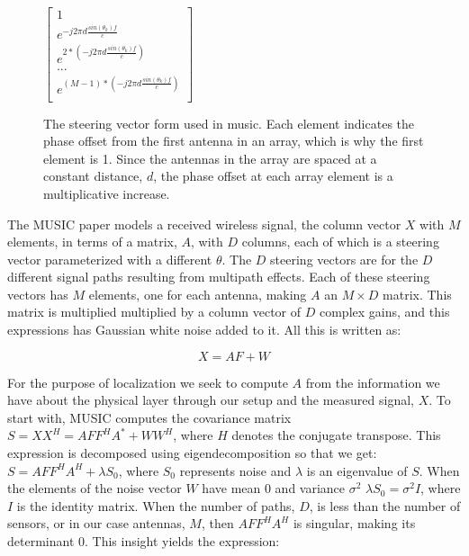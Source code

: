 \documentclass[12pt]{report}
\begin{document}
\begin{figure}
    \begin{center}
        \caption{The steering vector form used in music. Each element indicates the phase offset from the first antenna in an array, which is why the first element is 1. Since the antennas in the array are spaced at a constant distance, $d$, the phase offset at each array element is a multiplicative increase.}
        \label{figure: music-steering-vector}
        $\begin{bmatrix}
        1 \\
        e^{-j 2 \pi d \frac{sin(\theta_{k}) f}{c}} \\
        e^{2 * (-j 2 \pi d \frac{sin(\theta_{k}) f}{c})} \\
        ... \\
        e^{(M - 1) * (-j 2 \pi d \frac{sin(\theta_{k}) f}{c})} \\
        \end{bmatrix}$
    \end{center}
\end{figure}

The MUSIC paper models a received wireless signal, the column vector $X$ with $M$ elements, in terms of a matrix, $A$, with $D$ columns, each of which is a steering vector parameterized with a different $\theta$. The $D$ steering vectors are for the $D$ different signal paths resulting from multipath effects. Each of these steering vectors has $M$ elements, one for each antenna, making $A$ an $M \times D$ matrix. This matrix is multiplied multiplied by a column vector of $D$ complex gains, and this expressions has Gaussian white noise added to it. All this is written as:

$$X = AF + W$$

For the purpose of localization we seek to compute $A$ from the information we have about the physical layer through our setup and the measured signal, $X$. To start with, MUSIC computes the covariance matrix $S = XX^{H} = A FF^{H} A^{*} + WW^{H}$, where $H$ denotes the conjugate transpose. This expression is decomposed using eigendecomposition so that we get: $S = A FF^{H} A^{H} + \lambda S_{0}$, where $S_{0}$ represents noise and $\lambda$ is an eigenvalue of $S$. When the elements of the noise vector $W$ have mean 0 and variance $\sigma^{2}$ $\lambda S_{0} = \sigma^{2} I$, where $I$ is the identity matrix. When the number of paths, $D$, is less than the number of sensors, or in our case antennas, $M$, then $A FF^{H} A^{H}$ is singular, making its determinant 0. This insight yields the expression:
\end{document}
